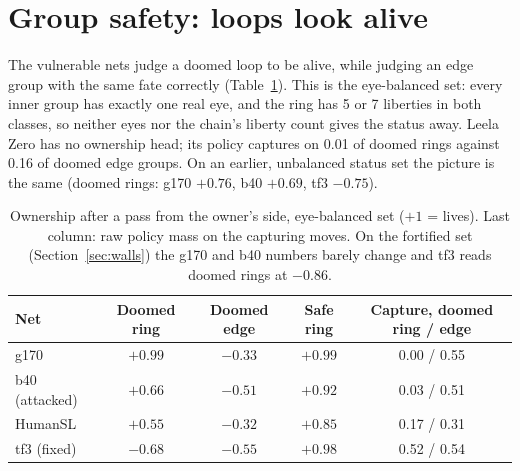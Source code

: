 \documentclass[11pt]{article}
\newcommand{\pos}[1]{$+#1$}
\newcommand{\nega}[1]{$-#1$}
\begin{document}
\section{Group safety: loops look alive}
\label{sec:safety}

The vulnerable nets judge a doomed loop to be alive, while judging an edge group with the same fate correctly (Table~\ref{tab:safety}). This is the eye-balanced set: every inner group has exactly one real eye, and the ring has 5 or 7 liberties in both classes, so neither eyes nor the chain's liberty count gives the status away. Leela Zero has no ownership head; its policy captures on 0.01 of doomed rings against 0.16 of doomed edge groups. On an earlier, unbalanced status set the picture is the same (doomed rings: g170 \pos{0.76}, b40 \pos{0.69}, tf3 \nega{0.75}).

\begin{table}[h]
\centering\small
\begin{tabular}{@{}lcccc@{}}
\toprule
Net & Doomed ring & Doomed edge & Safe ring & Capture, doomed ring / edge \\
\midrule
g170 & $\mathbf{+0.99}$ & $-0.33$ & $+0.99$ & 0.00 / 0.55 \\
b40 (attacked) & $\mathbf{+0.66}$ & $-0.51$ & $+0.92$ & 0.03 / 0.51 \\
HumanSL & $+0.55$ & $-0.32$ & $+0.85$ & 0.17 / 0.31 \\
tf3 (fixed) & $\mathbf{-0.68}$ & $-0.55$ & $+0.98$ & 0.52 / 0.54 \\
\bottomrule
\end{tabular}
\caption{Ownership after a pass from the owner's side, eye-balanced set (\pos{1} = lives). Last column: raw policy mass on the capturing moves. On the fortified set (Section~\ref{sec:walls}) the g170 and b40 numbers barely change and tf3 reads doomed rings at \nega{0.86}.}
\label{tab:safety}
\end{table}
\end{document}
